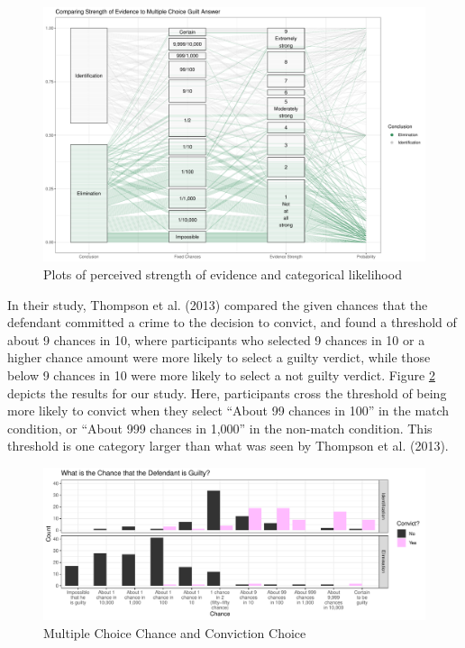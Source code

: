 \documentclass[print]{nuthesis}
\begin{document}
\begin{figure}

{\centering \includegraphics[width=\linewidth]{thesis_files/figure-latex/coordstrcat-1} 

}

\caption{Plots of perceived strength of evidence and categorical likelihood}\label{fig:coordstrcat}
\end{figure}

In their study, Thompson et al. (2013) compared the given chances that the defendant committed a crime to the decision to convict, and found a threshold of about 9 chances in 10, where participants who selected 9 chances in 10 or a higher chance amount were more likely to select a guilty verdict, while those below 9 chances in 10 were more likely to select a not guilty verdict.
Figure \ref{fig:convictlike} depicts the results for our study.
Here, participants cross the threshold of being more likely to convict when they select ``About 99 chances in 100'' in the match condition, or ``About 999 chances in 1,000'' in the non-match condition.
This threshold is one category larger than what was seen by Thompson et al. (2013).

\begin{figure}

{\centering \includegraphics[width=\linewidth]{thesis_files/figure-latex/convictlike-1} 

}

\caption{Multiple Choice Chance and Conviction Choice}\label{fig:convictlike}
\end{figure}
\end{document}
